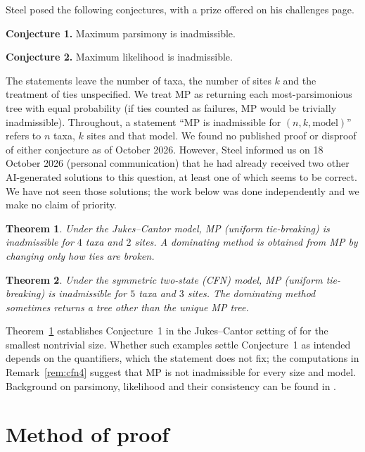 \documentclass[11pt]{amsart}
\newtheorem{theorem}{Theorem}
\theoremstyle{definition}
\theoremstyle{remark}
\begin{document}
Steel \cite{SteelConj,SteelChallenges} posed the following conjectures, with a prize offered on his challenges page.

\medskip
\noindent\textbf{Conjecture 1.} Maximum parsimony is inadmissible.

\noindent\textbf{Conjecture 2.} Maximum likelihood is inadmissible.
\medskip

The statements leave the number of taxa, the number of sites $k$ and the treatment of ties unspecified. We treat MP as returning each most-parsimonious tree with equal probability (if ties counted as failures, MP would be trivially inadmissible). Throughout, a statement ``MP is inadmissible for $(n,k,\text{model})$'' refers to $n$ taxa, $k$ sites and that model. We found no published proof or disproof of either conjecture as of October 2026. However, Steel informed us on 18 October 2026 (personal communication) that he had already received two other AI-generated solutions to this question, at least one of which seems to be correct. We have not seen those solutions; the work below was done independently and we make no claim of priority.

\begin{theorem}\label{thm:jc}
Under the Jukes--Cantor model, MP (uniform tie-breaking) is inadmissible for $4$ taxa and $2$ sites. A dominating method is obtained from MP by changing only how ties are broken.
\end{theorem}

\begin{theorem}\label{thm:cfn}
Under the symmetric two-state (CFN) model, MP (uniform tie-breaking) is inadmissible for $5$ taxa and $3$ sites. The dominating method sometimes returns a tree other than the unique MP tree.
\end{theorem}

Theorem~\ref{thm:jc} establishes Conjecture~1 in the Jukes--Cantor setting of \cite{SteelConj} for the smallest nontrivial size. Whether such examples settle Conjecture~1 as intended depends on the quantifiers, which the statement does not fix; the computations in Remark~\ref{rem:cfn4} suggest that MP is not inadmissible for every size and model. Background on parsimony, likelihood and their consistency can be found in \cite{Fel78,SS03,Steel16,TS97}.

\section{Method of proof}\label{sec:method}
\end{document}
